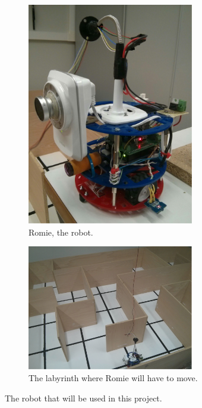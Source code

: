 \begin{figure}[ht]
	\centering
	\begin{subfigure}{0.35\textwidth}
		\centering
		\includegraphics[width=0.8\textwidth]{fig/romie}
		\caption{Romie, the robot.}\label{subfig:romie}
	\end{subfigure}\quad
	\begin{subfigure}{0.55\textwidth}
		\centering
		\includegraphics[width=0.8\textwidth]{fig/labyrinth}
		\caption{The labyrinth where Romie will have to move.}\label{subfig:labyrinth}
	\end{subfigure}\quad
	\caption{The robot that will be used in this project.}
\end{figure}

